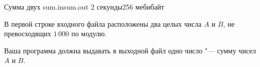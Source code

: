 \begin{problem}{Сумма двух}
{sum.in}{sum.out}
{2 секунды}{256 мебибайт}{}

\InputFile

В первой строке входного файла расположены два целых числа $A$ и $B$, 
не превосходящих $1\,000$ по модулю.

\OutputFile

Ваша программа должна выдавать в выходной файл одно число "--- сумму чисел
$A$ и $B$.

\Examples

\begin{example}
%
%
\end{example}

\end{problem}
